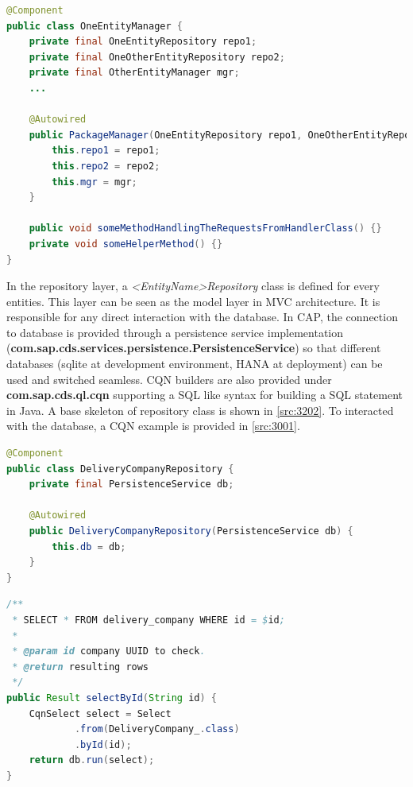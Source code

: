 \begin{lstlisting}[language={java}]
@Component
public class OneEntityManager {
    private final OneEntityRepository repo1;
    private final OneOtherEntityRepository repo2;
    private final OtherEntityManager mgr;
    ...

    @Autowired
    public PackageManager(OneEntityRepository repo1, OneOtherEntityRepository repo2, OtherEntityManager mgr) {
        this.repo1 = repo1;
        this.repo2 = repo2;
        this.mgr = mgr;
    }

    public void someMethodHandlingTheRequestsFromHandlerClass() {}
    private void someHelperMethod() {}
}
\end{lstlisting}


\bigskip
In the repository layer, a \textit{<EntityName>Repository} class is defined for every entities. This layer can be seen as the model layer in MVC architecture. It is responsible for any direct interaction with the database. In CAP, the connection to database is provided through a persistence service implementation (\textbf{com.sap.cds.services.persistence.PersistenceService}) so that different databases (sqlite at development environment, HANA at deployment) can be used and switched seamless. CQN builders are also provided under \textbf{com.sap.cds.ql.cqn} supporting a SQL like syntax for building a SQL statement in Java.
A base skeleton of repository class is shown in \autoref{src:3202}.
To interacted with the database, a CQN example is provided in \autoref{src:3001}.

\begin{lstlisting}[language={java}]
@Component
public class DeliveryCompanyRepository {
    private final PersistenceService db;

    @Autowired
    public DeliveryCompanyRepository(PersistenceService db) {
        this.db = db;
    }
}
\end{lstlisting}

\begin{lstlisting}[language={java}]
/**
 * SELECT * FROM delivery_company WHERE id = $id;
 *
 * @param id company UUID to check.
 * @return resulting rows
 */
public Result selectById(String id) {
    CqnSelect select = Select
            .from(DeliveryCompany_.class)
            .byId(id);
    return db.run(select);
}
\end{lstlisting}



